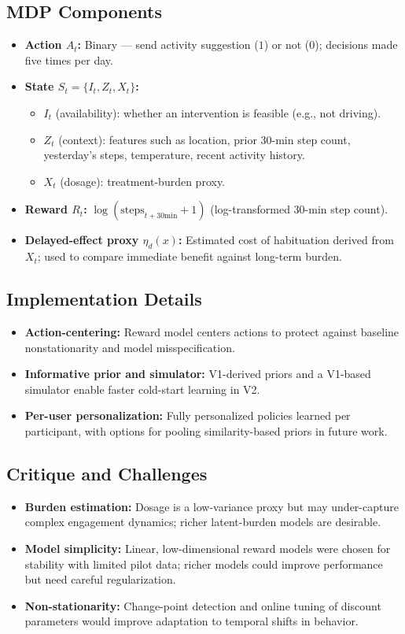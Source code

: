 \subsection*{MDP Components}
\begin{itemize}
    \item \textbf{Action $A_t$:} Binary — send activity suggestion ($1$) or not ($0$); decisions made five times per day.
    \item \textbf{State $S_t=\{I_t,Z_t,X_t\}$:}
        \begin{itemize}
            \item $I_t$ (availability): whether an intervention is feasible (e.g., not driving).
            \item $Z_t$ (context): features such as location, prior 30-min step count, yesterday's steps, temperature, recent activity history.
            \item $X_t$ (dosage): treatment-burden proxy.
        \end{itemize}
    \item \textbf{Reward $R_t$:} $\log(\text{steps}_{t+30\text{min}}+1)$ (log-transformed 30-min step count).
    \item \textbf{Delayed-effect proxy $\eta_d(x)$:} Estimated cost of habituation derived from $X_t$; used to compare immediate benefit against long-term burden.
\end{itemize}

\subsection*{Implementation Details}
\begin{itemize}
    \item \textbf{Action-centering:} Reward model centers actions to protect against baseline nonstationarity and model misspecification.
    \item \textbf{Informative prior and simulator:} V1-derived priors and a V1-based simulator enable faster cold-start learning in V2.
    \item \textbf{Per-user personalization:} Fully personalized policies learned per participant, with options for pooling similarity-based priors in future work.
\end{itemize}

\subsection*{Critique and Challenges}
\begin{itemize}
    \item \textbf{Burden estimation:} Dosage is a low-variance proxy but may under-capture complex engagement dynamics; richer latent-burden models are desirable.
    \item \textbf{Model simplicity:} Linear, low-dimensional reward models were chosen for stability with limited pilot data; richer models could improve performance but need careful regularization.
    \item \textbf{Non-stationarity:} Change-point detection and online tuning of discount parameters would improve adaptation to temporal shifts in behavior.
\end{itemize}

